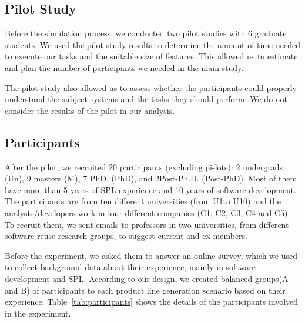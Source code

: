 \subsection{Pilot Study}

Before the simulation process, we conducted two pilot studies with 6 graduate students. We used the pilot study results to determine the amount of time needed to execute our tasks and the suitable size of features. This allowed us to estimate and plan the number of participants we needed in the main study. 

The pilot study also allowed us to assess whether the participants could properly understand the subject systems and the tasks they should perform. We do not consider the results of the pilot in our analysis.

\subsection{Participants}

After the pilot, we recruited 20 participants (excluding pi-lots): 2 undergrads (Un), 9 masters (M), 7 PhD. (PhD), and 2Post-Ph.D. (Post-PhD). Most of them have more than 5 years of SPL experience and 10 years of software development. The participants are from ten different universities (from U1to U10) and the analysts/developers work in four different companies (C1, C2, C3, C4 and C5). To recruit them, we sent emails to professors in two universities, from different software reuse research groups, to suggest current and ex-members. 

Before the experiment, we asked them to answer an online survey, which we used to collect background data about their experience, mainly in software development and SPL. According to our design, we created balanced groups(A and B) of participants to each product line generation scenario based on their experience. Table~\ref{tab:participants} shows the details of the participants involved in the experiment.


